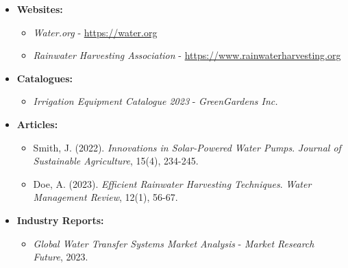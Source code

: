 \documentclass{article}
\begin{document}
\begin{itemize}
    \item \textbf{Websites:}
    \begin{itemize}
        \item \textit{Water.org} - \url{https://water.org}
        \item \textit{Rainwater Harvesting Association} - \url{https://www.rainwaterharvesting.org}
    \end{itemize}
    
    \item \textbf{Catalogues:}
    \begin{itemize}
        \item \textit{Irrigation Equipment Catalogue 2023} - \textit{GreenGardens Inc.}
    \end{itemize}
    
    \item \textbf{Articles:}
    \begin{itemize}
        \item Smith, J. (2022). \textit{Innovations in Solar-Powered Water Pumps}. \textit{Journal of Sustainable Agriculture}, 15(4), 234-245.
        \item Doe, A. (2023). \textit{Efficient Rainwater Harvesting Techniques}. \textit{Water Management Review}, 12(1), 56-67.
    \end{itemize}
    
    \item \textbf{Industry Reports:}
    \begin{itemize}
        \item \textit{Global Water Transfer Systems Market Analysis} - \textit{Market Research Future}, 2023.
    \end{itemize}
\end{itemize}
\end{document}
